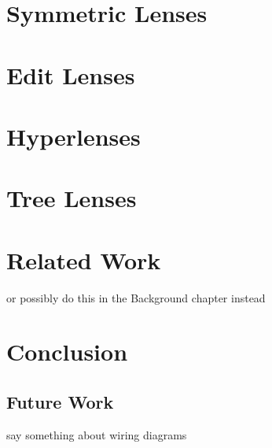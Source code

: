 \documentclass[12pt]{report}
\numberwithin{equation}{section}
\begin{document}


\chapter{Symmetric Lenses}
\label{chap:complement}



\chapter{Edit Lenses}
\label{chap:delta}

\mlinjargs\mlinjnoargs

\chapter{Hyperlenses}
\label{chap:hyper}



\chapter{Tree Lenses}
\label{chap:tree}



\chapter{Related Work}

or possibly do this in the Background chapter instead

\chapter{Conclusion}
\label{chap:conclusion}

\section{Future Work}
\label{sec:future}

say something about wiring diagrams



\end{document}
